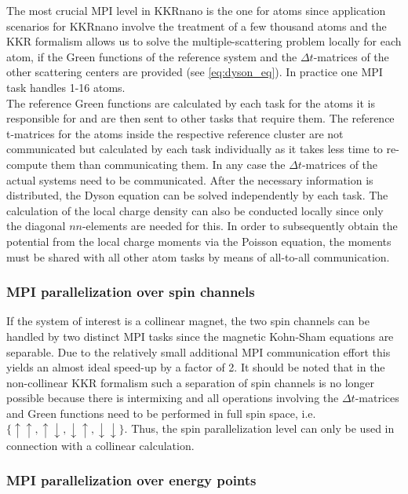 \documentclass [a4paper, 12pt]{article}
\begin{document}
The most crucial MPI level in KKRnano is the one for atoms since application scenarios for KKRnano
involve the treatment of a few thousand atoms and the KKR formalism allows us to solve the
multiple-scattering problem locally for each atom, if the Green functions of the reference system and
the $\Delta t$-matrices of the other scattering centers are provided (see \cref{eq:dyson_eq}).
In practice one MPI task handles 1-16 atoms.
\\
The reference Green functions are calculated by each task
for the atoms it is responsible for and are then sent to other tasks that require them. 
The reference t-matrices for the atoms inside the respective reference cluster are not communicated 
but calculated by each task individually as it takes less time to re-compute them than communicating them.
In any case the $\Delta t$-matrices of the actual systems need to be communicated.
After the necessary information is distributed, the Dyson equation can be solved independently by each task.
The calculation of the local charge density can also be conducted locally since only the diagonal
$nn$-elements are needed for this.
In order to subsequently obtain the potential from the local charge moments via the Poisson equation,
the moments must be shared with all other atom tasks by means of all-to-all communication.

\subsubsection*{MPI parallelization over spin channels}

If the system of interest is a collinear magnet, the two spin channels can be handled by two distinct
MPI tasks since the
magnetic Kohn-Sham equations are separable.
Due to the relatively small additional MPI communication effort
this yields an almost ideal speed-up by a factor of 2.
It should be noted that in the non-collinear KKR formalism such a 
separation of spin channels is no longer possible because 
there is intermixing and all operations involving the
$\Delta t$-matrices and Green functions
need to be performed in full spin space, i.e. $\{\uparrow \uparrow, \uparrow \downarrow,
\downarrow \uparrow, \downarrow \downarrow \}$.
Thus, the spin parallelization level can only be used in connection with
a collinear calculation.


\subsubsection*{MPI parallelization over energy points}
\end{document}
